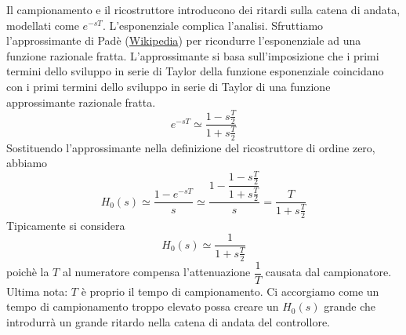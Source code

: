\documentclass[a4paper]{report}
\begin{document}
Il campionamento e il ricostruttore introducono dei ritardi sulla
catena di andata, modellati come $e^{-sT}$. L'esponenziale complica
l'analisi. Sfruttiamo l'approssimante di Pad\`e
(\href{http://it.wikipedia.org/wiki/Approssimante_di_Pad%C3%A9}{Wikipedia})
  per ricondurre l'esponenziale ad una funzione razionale
  fratta. L'approssimante si basa sull'imposizione che i primi termini
  dello sviluppo in serie di Taylor della funzione esponenziale
  coincidano con i primi termini dello sviluppo in serie di Taylor di
  una funzione approssimante razionale fratta.
\begin{equation}\label{eq:pade}
  e^{-sT} \simeq \dfrac{1 - s\frac{T}{2}}{1 + s\frac{T}{2}}
\end{equation}
Sostituendo l'approssimante nella definizione del ricostruttore di
ordine zero, abbiamo
\[
H_0(s) \simeq \dfrac{1 - e^{-sT}}{s} \simeq \dfrac{1 - \dfrac{1 -
    s\frac{T}{2}}{1 + s\frac{T}{2}}}{s} = \dfrac{T}{1 + s\frac{T}{2}}
\]
Tipicamente si considera
\[
H_0(s) \simeq \dfrac{1}{1 + s\frac{T}{2}}
\]
poich\`e la $T$ al numeratore compensa l'attenuazione $\dfrac{1}{T}$
causata dal campionatore. Ultima nota: $T$ \`e proprio il tempo di
campionamento. Ci accorgiamo come un tempo di campionamento troppo
elevato possa creare un $H_0(s)$ grande che introdurr\`a un grande
ritardo nella catena di andata del controllore.
\end{document}
